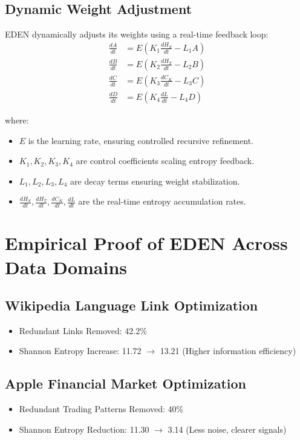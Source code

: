 \documentclass{article}
\begin{document}
\subsection{Dynamic Weight Adjustment}
EDEN dynamically adjusts its weights using a real-time feedback loop:
\begin{align}
\frac{dA}{dt} &= E (K_1 \frac{dH_S}{dt} - L_1 A) \\
\frac{dB}{dt} &= E (K_2 \frac{dH_T}{dt} - L_2 B) \\
\frac{dC}{dt} &= E (K_3 \frac{dC_K}{dt} - L_3 C) \\
\frac{dD}{dt} &= E (K_4 \frac{dL}{dt} - L_4 D)
\end{align}

where:
\begin{itemize}
    \item $E$ is the learning rate, ensuring controlled recursive refinement.
    \item $K_1, K_2, K_3, K_4$ are control coefficients scaling entropy feedback.
    \item $L_1, L_2, L_3, L_4$ are decay terms ensuring weight stabilization.
    \item $\frac{dH_S}{dt}, \frac{dH_T}{dt}, \frac{dC_K}{dt}, \frac{dL}{dt}$ are the real-time entropy accumulation rates.
\end{itemize}

\section{Empirical Proof of EDEN Across Data Domains}

\subsection{Wikipedia Language Link Optimization}
\begin{itemize}
    \item Redundant Links Removed: 42.2\%
    \item Shannon Entropy Increase: 11.72 $\rightarrow$ 13.21 (Higher information efficiency)
\end{itemize}

\subsection{Apple Financial Market Optimization}
\begin{itemize}
    \item Redundant Trading Patterns Removed: 40\%
    \item Shannon Entropy Reduction: 11.30 $\rightarrow$ 3.14 (Less noise, clearer signals)
\end{itemize}
\end{document}
